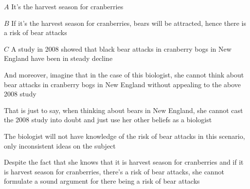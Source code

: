 \begin{frame}[allowframebreaks]
\framebreak

  \begin{itemizeminus}
    \item[$A$ ] It's the harvest season for cranberries
    
    \item[$B$ ] If it's the harvest season for cranberries, bears will be
    attracted, hence there is a risk of bear attacks
    
    \item[$C$ ] A study in 2008 showed that black bear attacks in cranberry bogs
    in New England have been in steady decline
  \end{itemizeminus}
  And moreover, imagine that in the case of this biologist, she cannot think about bear attacks in
  cranberry bogs in New England without appealing to the above 2008 study

\vspace{.2cm}  

  That is just to say, when thinking about bears in New England, 
   she cannot cast the 2008 study into doubt and just use her other 
   beliefs as a biologist

\framebreak
\begin{itemizedot}
  \item The biologist will not have knowledge of the risk of bear attacks in
  this scenario, only inconsistent ideas on the subject
  
  \item Despite the fact that she knows that it is harvest season for
  cranberries and if it is harvest season for cranberries, there's a risk of
  bear attacks, she cannot formulate a sound argument for there being a risk
  of bear attacks
\end{itemizedot}
\end{frame}
